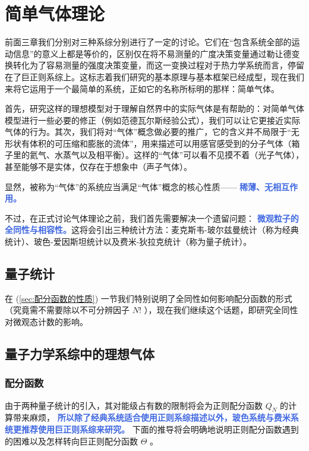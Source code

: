 \chapter{简单气体理论}\label{cha:简单气体}

前面三章我们分别对三种系综分别进行了一定的讨论。它们在“包含系统全部的运动信息”的意义上都是等价的，区别仅在将不易测量的广度决策变量通过勒让德变换转化为了容易测量的强度决策变量，而这一变换过程对于热力学系统而言，停留在了巨正则系综上。这标志着我们研究的基本原理与基本框架已经成型，现在我们来将它运用于一个最简单的系统，正如它的名称所标明的那样：简单气体。

首先，研究这样的理想模型对于理解自然界中的实际气体是有帮助的：对简单气体模型进行一些必要的修正（例如范德瓦尔斯经验公式），我们可以让它更接近实际气体的行为。其次，我们将对“气体”概念做必要的推广，它的含义并不局限于“无形状有体积的可压缩和膨胀的流体”，用来描述可以用感官感受到的分子气体（箱子里的氦气、水蒸气以及相平衡）。这样的“气体”可以看不见摸不着（光子气体），甚至能够不是实体，仅存在于想象中（声子气体）。

显然，被称为“气体”的系统应当满足“气体”概念的核心性质—— \textcolor{RoyalBlue}{\textbf{\kaishu 稀薄、无相互作用。}}

不过，在正式讨论气体理论之前，我们首先需要解决一个遗留问题： \textcolor{RoyalBlue}{\textbf{\kaishu 微观粒子的全同性与相容性。}}这将会引出三种统计方法：麦克斯韦-玻尔兹曼统计（称为经典统计）、玻色-爱因斯坦统计以及费米-狄拉克统计（称为量子统计）。

\section{量子统计}\label{sec:量子统计}

在 (\ref*{sec:配分函数的性质}) 一节我们特别说明了全同性如何影响配分函数的形式（究竟需不需要除以不可分辨因子 $N!$ ），现在我们继续这个话题，即研究全同性对微观态计数的影响。

\section{量子力学系综中的理想气体}\label{sec:量子力学系综中的理想气体}

\subsection{配分函数}
由于两种量子统计的引入，其对能级占有数的限制将会为正则配分函数 $Q_N$ 的计算带来麻烦， \textcolor{RoyalBlue}{\textbf{\kaishu 所以除了经典系统适合使用正则系综描述以外，玻色系统与费米系统更推荐使用巨正则系综来研究。}} 下面的推导将会明确地说明正则配分函数遇到的困难以及怎样转向巨正则配分函数 $\Theta$ 。

